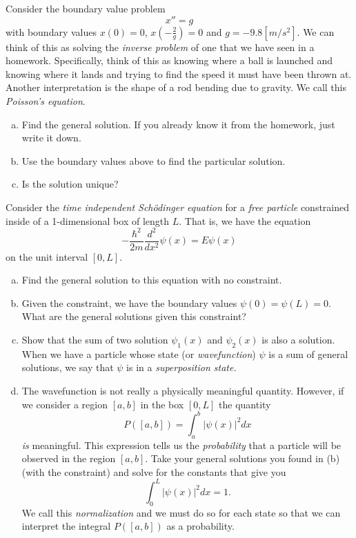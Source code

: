 \documentclass[12pt]{article} %
\begin{document}
\begin{problem}
Consider the boundary value problem
\[
x''=g
\]
with boundary values $x(0)=0$, $x\left(-\frac{2}{g}\right)=0$ and $g=-9.8[m/s^2]$.  We can think of this as solving the \emph{inverse problem} of one that we have seen in a homework. Specifically, think of this as knowing where a ball is launched and knowing where it lands and trying to find the speed it must have been thrown at.  Another interpretation is the shape of a rod bending due to gravity. We call this \emph{Poisson's equation}.
\begin{enumerate}[(a)]
    \item Find the general solution. If you already know it from the homework, just write it down.
    \item Use the boundary values above to find the particular solution.
    \item Is the solution unique? 
\end{enumerate}
\end{problem}

\begin{problem}
Consider the \emph{time independent Sch\"odinger equation} for a \emph{free particle} constrained inside of a 1-dimensional box of length $L$. That is, we have the equation
\[
-\frac{\hbar^2}{2m}\frac{d^2}{dx^2}\psi(x)=E\psi(x)
\]
on the unit interval $[0,L]$.
\begin{enumerate}[(a)]
    \item Find the general solution to this equation with no constraint.
    \item Given the constraint, we have the boundary values $\psi(0)=\psi(L)=0$. What are the general solutions given this constraint?
    \item Show that the sum of two solution $\psi_1(x)$ and $\psi_2(x)$ is also a solution. When we have a particle whose state (or \emph{wavefunction}) $\psi$ is a sum of general solutions, we say that $\psi$ is in a \emph{superposition state.}
    \item The wavefunction is not really a physically meaningful quantity.  However, if we consider a region $[a,b]$ in the box $[0,L]$ the quantity
    \[
    P([a,b])=\int_a^b |\psi(x)|^2dx
    \]
    \emph{is} meaningful. This expression tells us the \emph{probability} that a particle will be observed in the region $[a,b]$.  Take your general solutions you found in (b) (with the constraint) and solve for the constants that give you
    \[
    \int_0^L |\psi(x)|^2dx=1.
    \]
    We call this \emph{normalization} and we must do so for each state so that we can interpret the integral $P([a,b])$ as a probability.
\end{enumerate}
\end{problem}
\end{document}
